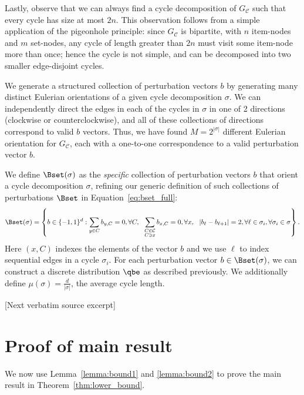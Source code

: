 \documentclass[10pt]{article}
\begin{document}
\begin{ReviewVerbatim}
	Lastly, observe that we can always find a cycle decomposition of $G_\mathcal{C}$ such that every cycle has size at most $2n$. This observation follows from a simple application of the pigeonhole principle: since $G_\mathcal{C}$ is bipartite, with $n$ item-nodes and $m$ set-nodes, any cycle of length greater than $2n$ must visit some item-node more than once; hence the cycle is not simple, and can be decomposed into two smaller edge-disjoint cycles.

	We generate a structured collection of perturbation vectors $b$ by generating many distinct Eulerian orientations of a given cycle decomposition $\sigma$. We can independently direct the edges in each of the	cycles in $\sigma$ in one of 2 directions (clockwise or counterclockwise), and all of these collections of directions correspond to valid $b$ vectors. Thus, we have found $M=2^{|\sigma|}$ different Eulerian orientation for $G_\mathcal{C}$, each with a one-to-one correspondence to a valid perturbation vector $b$.

	We define $\Bset(\sigma)$ as the {\it specific} collection of perturbation vectors $b$ that orient a cycle decomposition $\sigma$, refining our generic definition of such collections of perturbations $\Bset$ in Equation~\eqref{eq:bset_full}:
	\begin{align}
	\label{eq:bset}
	\Bset(\sigma) =
	\left \{
	b \in \lbrace -1, 1 \rbrace^d
	:
	\sum_{y \in C} b_{y,C} = 0, \forall C,
	\ \
	\sum_{\substack{C \in \mathcal{C}\\ C \ni x}} b_{x,C} = 0, \forall x,
	\ \
	|b_\ell - b_{\ell+1} | =2, \forall \ell \in \sigma_i,
	\forall \sigma_i \in \sigma
	\right \}.
	\end{align}
	Here $(x,C)$ indexes the elements of the vector $b$ and we use $\ell$ to index sequential edges in a cycle $\sigma_i$. For each perturbation vector $b \in \Bset(\sigma)$, we can construct a discrete distribution $\qbe$ as described previously. We additionally define $\mu(\sigma) = \frac{d}{|\sigma|}$, the average cycle length.

[Next verbatim source excerpt]

	\section{Proof of main result}
	\label{sec:thmproof}

	We now use Lemma~\ref{lemma:bound1} and \ref{lemma:bound2} to prove the main result in Theorem~\ref{thm:lower_bound}.


\end{ReviewVerbatim}
\end{document}
